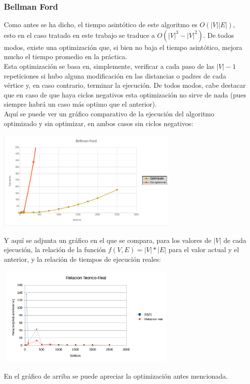 \documentclass{article}
\newcommand\tab[1][0.5cm]{\hspace*{#1}}
\begin{document}
            \subsubsection{Bellman Ford}
            \tab Como antes se ha dicho, el tiempo asintótico de este algoritmo es $O(|V||E|)$, esto en el caso
            tratado en este trabajo se traduce a $O(|V|^3 - |V|^2)$. De todos modos, existe una optimización que,
            si bien no baja el tiempo asintótico, mejora mucho el tiempo promedio en la práctica. \\
            \tab Esta optimización se basa en, simplemente, verificar a cada paso de las $|V| - 1$ repeticiones
            si hubo alguna modificación en las distancias o padres de cada vértice y, en caso contrario, terminar
            la ejecución. De todos modos, cabe destacar que en caso de que haya ciclos negativos esta optimización
            no sirve de nada (pues siempre habrá un caso más optimo que el anterior). \\
            \tab Aquí se puede ver un gráfico comparativo de la ejecución del algoritmo optimizado y sin optimizar,
            en ambos casos sin ciclos negativos:
            \begin{center}
                \includegraphics[width=9cm, height=5cm]{images/GraficoBellmanFord}
            \end{center}
            \tab Y aquí se adjunta un gráfico en el que se compara, para los valores de $|V|$ de cada ejecución,
            la relación de la función $f(V, E) = |V|*|E|$ para el valor actual y el anterior, y la relación de
            tiempos de ejecución reales:
            \begin{center}
                \includegraphics[width=9cm, height=5cm]{images/RelacionBellmanFord}
            \end{center}
            \tab En el gráfico de arriba se puede apreciar la optimización antes mencionada.
\end{document}
